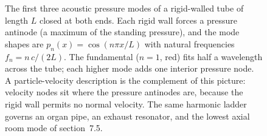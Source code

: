 \begin{figure}[htbp]
\centering
{}
\caption[Standing-wave modes in a closed tube]{The first three
acoustic pressure modes of a rigid-walled tube of length $L$ closed at
both ends. Each rigid wall forces a pressure antinode (a maximum of the
standing pressure), and the mode shapes are $p_n(x)=\cos(n\pi x/L)$ with
natural frequencies $f_n = n\,c/(2L)$. The fundamental ($n=1$, red)
fits half a wavelength across the tube; each higher mode adds one
interior pressure node. A particle-velocity description is the
complement of this picture: velocity nodes sit where the pressure
antinodes are, because the rigid wall permits no normal velocity. The
same harmonic ladder governs an organ pipe, an exhaust resonator, and
the lowest axial room mode of section~7.5.}
\label{fig:vol03ch07:standing-wave}
\end{figure}
